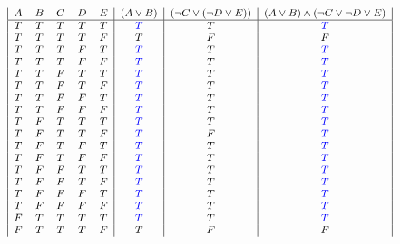 \documentclass{article}
\begin{document}
\begin{enumerate}
        \begin{center}
            \begin{displaymath}
                {\footnotesize \begin{array}{|c c c c c|c|c|c|c|}
                A & B & C & D & E & (A \lor B) & (\neg C \lor (\neg D \lor E)) & (A \lor B) \land (\neg C \lor \neg D \lor E) \\
                \hline
                T & T & T & T & T & {\textcolor{blue}{T}} & T & {\textcolor{blue}{T}}\\
                T & T & T & T & F & T & F & F\\
                T & T & T & F & T & {\textcolor{blue}{T}} & T & {\textcolor{blue}{T}}\\
                T & T & T & F & F & {\textcolor{blue}{T}} & T & {\textcolor{blue}{T}}\\
                T & T & F & T & T & {\textcolor{blue}{T}} & T & {\textcolor{blue}{T}}\\
                T & T & F & T & F & {\textcolor{blue}{T}} & T & {\textcolor{blue}{T}}\\
                T & T & F & F & T & {\textcolor{blue}{T}} & T & {\textcolor{blue}{T}}\\
                T & T & F & F & F & {\textcolor{blue}{T}} & T & {\textcolor{blue}{T}}\\
                T & F & T & T & T & {\textcolor{blue}{T}} & T & {\textcolor{blue}{T}}\\        
                T & F & T & T & F & {\textcolor{blue}{T}} & F & {\textcolor{blue}{T}}\\
                T & F & T & F & T & {\textcolor{blue}{T}} & T & {\textcolor{blue}{T}}\\
                T & F & T & F & F & {\textcolor{blue}{T}} & T & {\textcolor{blue}{T}}\\
                T & F & F & T & T & {\textcolor{blue}{T}} & T & {\textcolor{blue}{T}}\\
                T & F & F & T & F & {\textcolor{blue}{T}} & T & {\textcolor{blue}{T}}\\
                T & F & F & F & T & {\textcolor{blue}{T}} & T & {\textcolor{blue}{T}}\\
                T & F & F & F & F & {\textcolor{blue}{T}} & T & {\textcolor{blue}{T}}\\
                F & T & T & T & T & {\textcolor{blue}{T}} & T & {\textcolor{blue}{T}}\\
                F & T & T & T & F & T & F & F\\

\end{array}}
\end{displaymath}
\end{center}
\end{enumerate}
\end{document}
